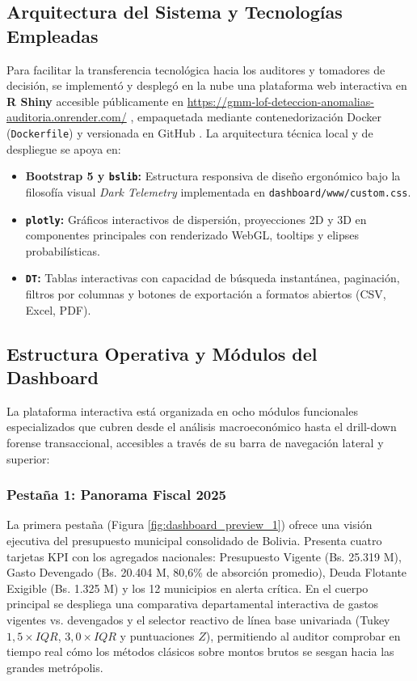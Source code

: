 \documentclass[11pt,a4paper]{article}
\begin{document}
\subsection{Arquitectura del Sistema y Tecnologías Empleadas}
Para facilitar la transferencia tecnológica hacia los auditores y tomadores de decisión, se implementó y desplegó en la nube una plataforma web interactiva en \textbf{R Shiny} accesible públicamente en \url{https://gmm-lof-deteccion-anomalias-auditoria.onrender.com/} \citep{render_dashboard}, empaquetada mediante contenedorización Docker (\texttt{Dockerfile}) y versionada en GitHub \citep{github_proyecto}. La arquitectura técnica local y de despliegue se apoya en:
\begin{itemize}[noitemsep]
    \item \textbf{Bootstrap 5 y \texttt{bslib}:} Estructura responsiva de diseño ergonómico bajo la filosofía visual \textit{Dark Telemetry} implementada en \texttt{dashboard/www/custom.css}.
    \item \textbf{\texttt{plotly}:} Gráficos interactivos de dispersión, proyecciones 2D y 3D en componentes principales con renderizado WebGL, tooltips y elipses probabilísticas.
    \item \textbf{\texttt{DT}:} Tablas interactivas con capacidad de búsqueda instantánea, paginación, filtros por columnas y botones de exportación a formatos abiertos (CSV, Excel, PDF).
\end{itemize}

\subsection{Estructura Operativa y Módulos del Dashboard}
La plataforma interactiva está organizada en ocho módulos funcionales especializados que cubren desde el análisis macroeconómico hasta el drill-down forense transaccional, accesibles a través de su barra de navegación lateral y superior:

\subsubsection{Pestaña 1: Panorama Fiscal 2025}
La primera pestaña (Figura \ref{fig:dashboard_preview_1}) ofrece una visión ejecutiva del presupuesto municipal consolidado de Bolivia. Presenta cuatro tarjetas KPI con los agregados nacionales: Presupuesto Vigente (Bs. 25.319 M), Gasto Devengado (Bs. 20.404 M, 80,6\% de absorción promedio), Deuda Flotante Exigible (Bs. 1.325 M) y los 12 municipios en alerta crítica. En el cuerpo principal se despliega una comparativa departamental interactiva de gastos vigentes vs. devengados y el selector reactivo de línea base univariada (Tukey $1,5 \times IQR$, $3,0 \times IQR$ y puntuaciones $Z$), permitiendo al auditor comprobar en tiempo real cómo los métodos clásicos sobre montos brutos se sesgan hacia las grandes metrópolis.
\end{document}
